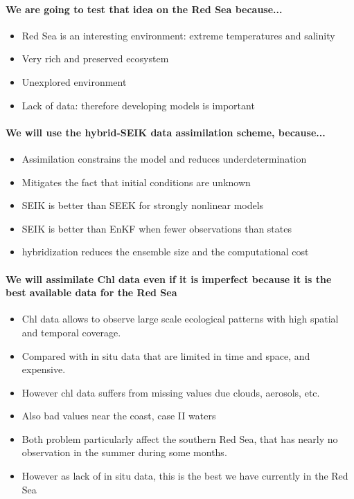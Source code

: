 \paragraph{We are going to test that idea on the Red Sea because...}

\begin{itemize}
  \item Red Sea is an interesting environment: extreme temperatures and
salinity
  \item Very rich and preserved ecosystem
  \item Unexplored environment
  \item Lack of data: therefore developing models is important
\end{itemize}

\paragraph{We will use the hybrid-SEIK data assimilation scheme, because...}

\begin{itemize}
  \item Assimilation constrains the model and reduces underdetermination
  \item Mitigates the fact that initial conditions are unknown
  \item SEIK is better than SEEK for strongly nonlinear models
  \item SEIK is better than EnKF when fewer observations than states
  \item hybridization reduces the ensemble size and the computational cost
\end{itemize}

\paragraph{We will assimilate Chl data even if it is imperfect because it is
the best available data for the Red Sea}

\begin{itemize}
  \item Chl data allows to observe large scale ecological patterns with
high spatial and temporal coverage.
  \item Compared with in situ data that are limited in time and space,
and expensive.
  \item However chl data suffers from missing values due clouds, aerosols, etc.
  \item Also bad values near the coast, case II waters
  \item Both problem particularly affect the southern Red Sea, that has
nearly no observation in the summer during some months.
  \item However as lack of in situ data, this is the best we have
currently in the Red Sea
\end{itemize}

